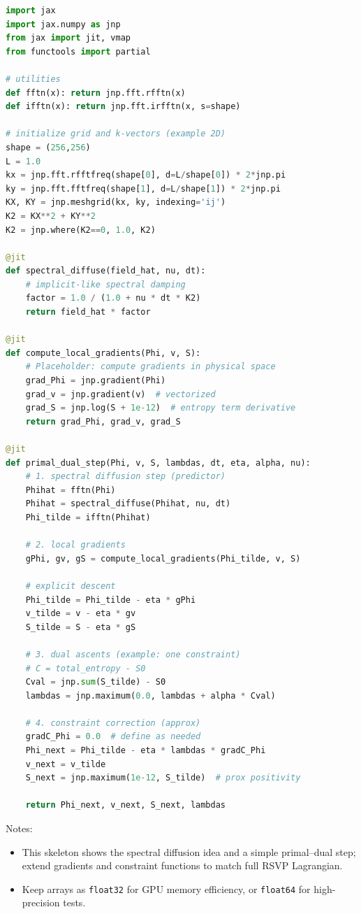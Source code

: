 \documentclass[11pt,a4paper]{article}
\begin{document}
\begin{lstlisting}[language=Python,caption={JAX spectral primal–dual solver skeleton (rsvp/jax_solver.py)}]
import jax
import jax.numpy as jnp
from jax import jit, vmap
from functools import partial

# utilities
def fftn(x): return jnp.fft.rfftn(x)
def ifftn(x): return jnp.fft.irfftn(x, s=shape)

# initialize grid and k-vectors (example 2D)
shape = (256,256)
L = 1.0
kx = jnp.fft.rfftfreq(shape[0], d=L/shape[0]) * 2*jnp.pi
ky = jnp.fft.fftfreq(shape[1], d=L/shape[1]) * 2*jnp.pi
KX, KY = jnp.meshgrid(kx, ky, indexing='ij')
K2 = KX**2 + KY**2
K2 = jnp.where(K2==0, 1.0, K2)

@jit
def spectral_diffuse(field_hat, nu, dt):
    # implicit-like spectral damping
    factor = 1.0 / (1.0 + nu * dt * K2)
    return field_hat * factor

@jit
def compute_local_gradients(Phi, v, S):
    # Placeholder: compute gradients in physical space
    grad_Phi = jnp.gradient(Phi)
    grad_v = jnp.gradient(v)  # vectorized
    grad_S = jnp.log(S + 1e-12)  # entropy term derivative
    return grad_Phi, grad_v, grad_S

@jit
def primal_dual_step(Phi, v, S, lambdas, dt, eta, alpha, nu):
    # 1. spectral diffusion step (predictor)
    Phihat = fftn(Phi)
    Phihat = spectral_diffuse(Phihat, nu, dt)
    Phi_tilde = ifftn(Phihat)

    # 2. local gradients
    gPhi, gv, gS = compute_local_gradients(Phi_tilde, v, S)

    # explicit descent
    Phi_tilde = Phi_tilde - eta * gPhi
    v_tilde = v - eta * gv
    S_tilde = S - eta * gS

    # 3. dual ascents (example: one constraint)
    # C = total_entropy - S0
    Cval = jnp.sum(S_tilde) - S0
    lambdas = jnp.maximum(0.0, lambdas + alpha * Cval)

    # 4. constraint correction (approx)
    gradC_Phi = 0.0  # define as needed
    Phi_next = Phi_tilde - eta * lambdas * gradC_Phi
    v_next = v_tilde
    S_next = jnp.maximum(1e-12, S_tilde)  # prox positivity

    return Phi_next, v_next, S_next, lambdas
\end{lstlisting}

Notes:

\begin{itemize}
  \item This skeleton shows the spectral diffusion idea and a simple primal–dual step; extend gradients and constraint functions to match full RSVP Lagrangian.
  \item Keep arrays as \texttt{float32} for GPU memory efficiency, or \texttt{float64} for high-precision tests.
\end{itemize}
\end{document}
